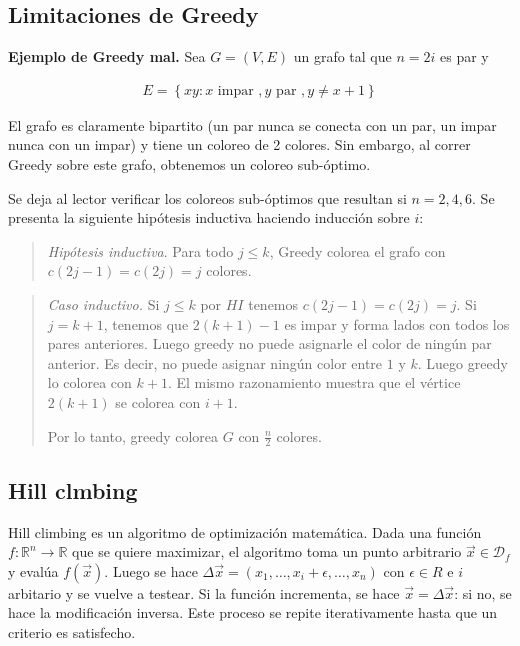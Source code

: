 \documentclass[a4paper, 12pt]{article}
\begin{document}
\pagebreak

\subsection{Limitaciones de Greedy}


\textbf{Ejemplo de Greedy mal.} Sea $G = (V, E)$ un grafo tal que $n = 2i$ es par
y 

\begin{align*}
    E = \left\{ xy : x \text{ impar }, y \text{ par }, y \neq x + 1\right\} 
\end{align*}

El grafo es claramente bipartito (un par nunca se conecta con un par, un impar
nunca con un impar) y tiene un coloreo de 2 colores. Sin embargo, al correr
Greedy sobre este grafo, obtenemos un coloreo sub-óptimo.

Se deja al lector verificar los coloreos sub-óptimos que resultan si $n = 2, 4,
6$. Se presenta la siguiente hipótesis inductiva haciendo inducción sobre $i$:


\small
\begin{quote}

\textit{Hipótesis inductiva}. Para todo $j \leq k$, Greedy colorea el grafo con
$c(2j - 1) = c(2j) = j$ colores.

\end{quote}
\normalsize

\small
\begin{quote}

    \textit{Caso inductivo.} Si $j \leq k$ por $HI$ tenemos $c(2j - 1) = c(2j) =
    j$. Si $j = k + 1$, tenemos que $2(k+1) - 1$ es impar y forma lados con
    todos los pares anteriores. Luego greedy no puede asignarle el color de
    ningún par anterior. Es decir, no puede asignar ningún color entre $1$ y
    $k$. Luego greedy lo colorea con $k + 1$. El mismo razonamiento muestra que
    el vértice $2(k+1)$ se colorea con $i + 1$.

    Por lo tanto, greedy colorea $G$ con $\frac{n}{2}$ colores.


\end{quote}
\normalsize


\subsection{Hill clmbing}

Hill climbing es un algoritmo de optimización matemática. Dada una función $f :
\mathbb{R}^n \to \mathbb{R}$ que se quiere maximizar, el algoritmo toma un punto
arbitrario
$\vec{x} \in \mathcal{D}_f$ y evalúa $f(\vec{x})$. Luego se hace $\Delta\vec{x} =
(x_1, \ldots, x_{i} + \epsilon, \ldots, x_n)$ con $\epsilon \in R$ e $i$
arbitario y se vuelve a testear. Si la función incrementa, se hace
$\vec{x} = \Delta\vec{x}$: si no, se hace la modificación inversa. Este proceso
se repite iterativamente hasta que un criterio es satisfecho.
\end{document}
